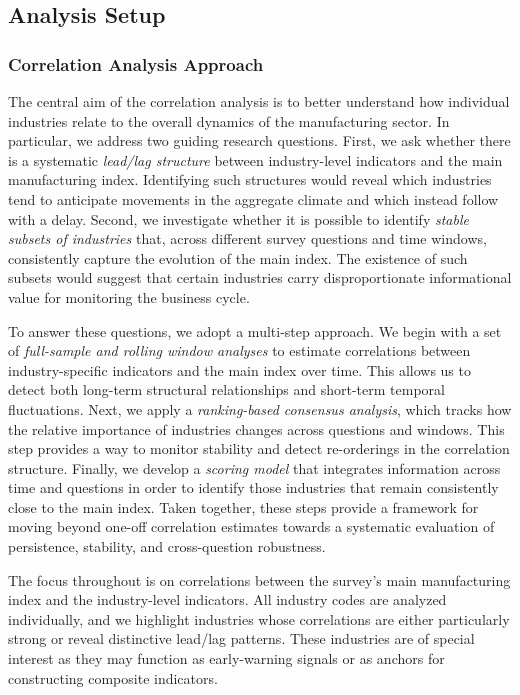 \subsection{Analysis Setup}

\subsubsection{Correlation Analysis Approach}
The central aim of the correlation analysis is to better understand how individual industries relate to the overall dynamics of the manufacturing sector. In particular, we address two guiding research questions. First, we ask whether there is a systematic \textit{lead/lag structure} between industry-level indicators and the main manufacturing index. Identifying such structures would reveal which industries tend to anticipate movements in the aggregate climate and which instead follow with a delay. Second, we investigate whether it is possible to identify \textit{stable subsets of industries} that, across different survey questions and time windows, consistently capture the evolution of the main index. The existence of such subsets would suggest that certain industries carry disproportionate informational value for monitoring the business cycle.

To answer these questions, we adopt a multi-step approach. We begin with a set of \textit{full-sample and rolling window analyses} to estimate correlations between industry-specific indicators and the main index over time. This allows us to detect both long-term structural relationships and short-term temporal fluctuations. Next, we apply a \textit{ranking-based consensus analysis}, which tracks how the relative importance of industries changes across questions and windows. This step provides a way to monitor stability and detect re-orderings in the correlation structure. Finally, we develop a \textit{scoring model} that integrates information across time and questions in order to identify those industries that remain consistently close to the main index. Taken together, these steps provide a framework for moving beyond one-off correlation estimates towards a systematic evaluation of persistence, stability, and cross-question robustness.

The focus throughout is on correlations between the survey’s main manufacturing index and the industry-level indicators. All industry codes are analyzed individually, and we highlight industries whose correlations are either particularly strong or reveal distinctive lead/lag patterns. These industries are of special interest as they may function as early-warning signals or as anchors for constructing composite indicators.

